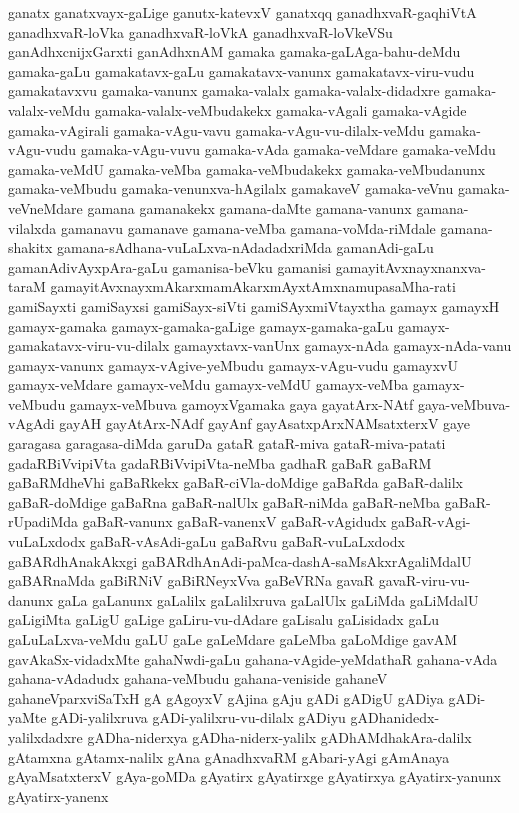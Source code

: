 {ganatx
ganatxvayx-gaLige
ganutx-katevxV
ganatxqq
ganadhxvaR-gaqhiVtA
ganadhxvaR-loVka
ganadhxvaR-loVkA
ganadhxvaR-loVkeVSu
ganAdhxcnijxGarxti
ganAdhxnAM
gamaka
gamaka-gaLAga-bahu-deMdu
gamaka-gaLu
gamakatavx-gaLu
gamakatavx-vanunx
gamakatavx-viru-vudu
gamakatavxvu
gamaka-vanunx
gamaka-valalx
gamaka-valalx-didadxre
gamaka-valalx-veMdu
gamaka-valalx-veMbudakekx
gamaka-vAgali
gamaka-vAgide
gamaka-vAgirali
gamaka-vAgu-vavu
gamaka-vAgu-vu-dilalx-veMdu
gamaka-vAgu-vudu
gamaka-vAgu-vuvu
gamaka-vAda
gamaka-veMdare
gamaka-veMdu
gamaka-veMdU
gamaka-veMba
gamaka-veMbudakekx
gamaka-veMbudanunx
gamaka-veMbudu
gamaka-venunxva-hAgilalx
gamakaveV
gamaka-veVnu
gamaka-veVneMdare
gamana
gamanakekx
gamana-daMte
gamana-vanunx
gamana-vilalxda
gamanavu
gamanave
gamana-veMba
gamana-voMda-riMdale
gamana-shakitx
gamana-sAdhana-vuLaLxva-nAdadadxriMda
gamanAdi-gaLu
gamanAdivAyxpAra-gaLu
gamanisa-beVku
gamanisi
gamayitAvxnayxnanxva-taraM
gamayitAvxnayxmAkarxmamAkarxmAyxtAmxnamupasaMha-rati
gamiSayxti
gamiSayxsi
gamiSayx-siVti
gamiSAyxmiVtayxtha
gamayx
gamayxH
gamayx-gamaka
gamayx-gamaka-gaLige
gamayx-gamaka-gaLu
gamayx-gamakatavx-viru-vu-dilalx
gamayxtavx-vanUnx
gamayx-nAda
gamayx-nAda-vanu
gamayx-vanunx
gamayx-vAgive-yeMbudu
gamayx-vAgu-vudu
gamayxvU
gamayx-veMdare
gamayx-veMdu
gamayx-veMdU
gamayx-veMba
gamayx-veMbudu
gamayx-veMbuva
gamoyxVgamaka
gaya
gayatArx-NAtf
gaya-veMbuva-vAgAdi
gayAH
gayAtArx-NAdf
gayAnf
gayAsatxpArxNAMsatxterxV
gaye
garagasa
garagasa-diMda
garuDa
gataR
gataR-miva
gataR-miva-patati
gadaRBiVvipiVta
gadaRBiVvipiVta-neMba
gadhaR
gaBaR
gaBaRM
gaBaRMdheVhi
gaBaRkekx
gaBaR-ciVla-doMdige
gaBaRda
gaBaR-dalilx
gaBaR-doMdige
gaBaRna
gaBaR-nalUlx
gaBaR-niMda
gaBaR-neMba
gaBaR-rUpadiMda
gaBaR-vanunx
gaBaR-vanenxV
gaBaR-vAgidudx
gaBaR-vAgi-vuLaLxdodx
gaBaR-vAsAdi-gaLu
gaBaRvu
gaBaR-vuLaLxdodx
gaBARdhAnakAkxgi
gaBARdhAnAdi-paMca-dashA-saMsAkxrAgaliMdalU
gaBARnaMda
gaBiRNiV
gaBiRNeyxVva
gaBeVRNa
gavaR
gavaR-viru-vu-danunx
gaLa
gaLanunx
gaLalilx
gaLalilxruva
gaLalUlx
gaLiMda
gaLiMdalU
gaLigiMta
gaLigU
gaLige
gaLiru-vu-dAdare
gaLisalu
gaLisidadx
gaLu
gaLuLaLxva-veMdu
gaLU
gaLe
gaLeMdare
gaLeMba
gaLoMdige
gavAM
gavAkaSx-vidadxMte
gahaNwdi-gaLu
gahana-vAgide-yeMdathaR
gahana-vAda
gahana-vAdadudx
gahana-veMbudu
gahana-veniside
gahaneV
gahaneVparxviSaTxH
gA
gAgoyxV
gAjina
gAju
gADi
gADigU
gADiya
gADi-yaMte
gADi-yalilxruva
gADi-yalilxru-vu-dilalx
gADiyu
gADhanidedx-yalilxdadxre
gADha-niderxya
gADha-niderx-yalilx
gADhAMdhakAra-dalilx
gAtamxna
gAtamx-nalilx
gAna
gAnadhxvaRM
gAbari-yAgi
gAmAnaya
gAyaMsatxterxV
gAya-goMDa
gAyatirx
gAyatirxge
gAyatirxya
gAyatirx-yanunx
gAyatirx-yanenx
}
